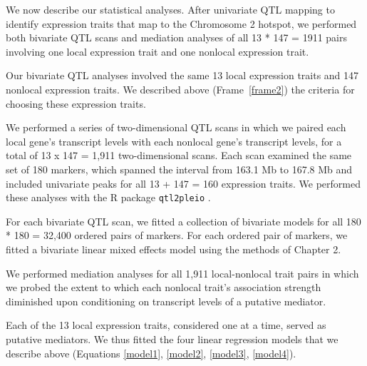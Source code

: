 \documentclass[oneside]{book}\usepackage[]{graphicx}\usepackage[]{color}
\begin{document}

We now describe our statistical analyses. 
After univariate QTL mapping to identify expression traits that 
map to the Chromosome 2 hotspot, 
we performed both bivariate QTL scans and mediation analyses of all 13 * 147 = 1911 pairs
involving one local expression trait and one nonlocal expression trait.




Our bivariate QTL analyses involved the same 13 local expression traits and 147 nonlocal expression traits. 
We described above (Frame~\ref{frame2}) the criteria for choosing these expression traits.

We performed a series of two-dimensional QTL scans in which we paired each local gene's
transcript levels with each nonlocal gene's transcript levels, 
for a total of 13 x 147 = 1,911 two-dimensional scans. 
Each scan examined the same set of 180 markers, which spanned the interval from 163.1 Mb to 167.8 Mb and included univariate peaks for all 13 + 147 = 160 expression traits. 
We performed these analyses with the R package \texttt{qtl2pleio} \citep{qtl2pleio}.

For each bivariate QTL scan, we fitted a collection of bivariate models for 
all 180 * 180 = 32,400 ordered pairs of markers. 
For each ordered pair of markers, we fitted a bivariate linear mixed
effects model using the methods of Chapter 2.


We performed mediation analyses for 
all 1,911 local-nonlocal trait pairs in which
we probed the extent to which each nonlocal trait's association 
strength diminished upon conditioning on transcript levels of a putative mediator.

Each of the 13 local expression traits, considered one at a time, served as putative mediators. 
We thus fitted the four linear regression models that we describe
above (Equations \ref{model1}, \ref{model2}, \ref{model3}, \ref{model4}).
\end{document}

